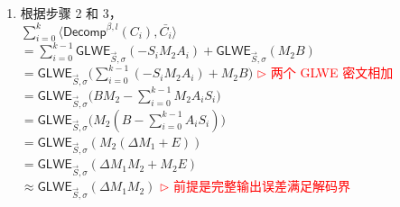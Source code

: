 \begin{myproof}
\begin{enumerate}
$ $
因此： \\
$\langle \textsf{Decomp}^{\beta, l}(A_0), \bar{C_0} \rangle + \langle \textsf{Decomp}^{\beta, l}(A_1), \bar{C_1} \rangle + \gap{$\cdots$} + \langle \textsf{Decomp}^{\beta, l}(A_{k-1}), \bar{C}_{k-1} \rangle$ \\
$= \sum\limits_{i=0}^{k-1}\langle \textsf{Decomp}^{\beta, l}(A_i), \bar{C_i} \rangle$ \\
$= \sum\limits_{i=0}^{k-1}\left(A_{\langle i, 1\rangle} \cdot \textsf{GLWE}_{\vec{S}, \sigma}\left(-S_iM_2\dfrac{q}{\beta^1}\right) + A_{\langle i, 2\rangle} \cdot \textsf{GLWE}_{\vec{S}, \sigma}\left(-S_iM_2\dfrac{q}{\beta^2}\right) + \gap{$\cdots$} + A_{\langle i, l\rangle} \cdot \textsf{GLWE}_{\vec{S}, \sigma}\left(-S_iM_2\dfrac{q}{\beta^l}\right)\right)$ \\
$= \sum\limits_{i=0}^{k-1}\left(\textsf{GLWE}_{\vec{S}, \sigma}\left(-A_{\langle i, 1\rangle}S_iM_2\dfrac{q}{\beta^1}\right) + \textsf{GLWE}_{\vec{S}, \sigma}\left(-A_{\langle i, 2\rangle}S_iM_2\dfrac{q}{\beta^2}\right) + \gap{$\cdots$} + \textsf{GLWE}_{\vec{S}, \sigma}\left(-A_{\langle i, l\rangle}S_iM_2\dfrac{q}{\beta^l}\right)\right)$ \\
$= \sum\limits_{i=0}^{k-1}\textsf{GLWE}_{\vec{S}, \sigma}\left(-A_{\langle i, 1\rangle}S_iM_2\dfrac{q}{\beta^1} + -A_{\langle i, 2\rangle}S_iM_2\dfrac{q}{\beta^2} + \gap{$\cdots$} + -A_{\langle i, l\rangle}S_iM_2\dfrac{q}{\beta^l}\right)$ \\
$= \sum\limits_{i=0}^{k-1}\textsf{GLWE}_{\vec{S}, \sigma}\left(-S_iM_2 \cdot \left(A_{\langle i, 1\rangle}\dfrac{q}{\beta^1} + A_{\langle i, 2\rangle}\dfrac{q}{\beta^2} + \gap{$\cdots$} + A_{\langle i, l\rangle}\dfrac{q}{\beta^l}\right)\right)$ \\
$= \sum\limits_{i=0}^{k-1}\textsf{GLWE}_{\vec{S}, \sigma}(-S_iM_2A_i)$
\item 根据步骤 2 和 3， \\
$\sum\limits_{i=0}^{k}\langle \textsf{Decomp}^{\beta, l}(C_i), \bar{C_i} \rangle$ \\
$= \sum\limits_{i=0}^{k-1}\textsf{GLWE}_{\vec{S}, \sigma}(-S_iM_2A_i) + \textsf{GLWE}_{\vec{S}, \sigma} (M_{2}B)$ \\ 
$= \textsf{GLWE}_{\vec{S}, \sigma}\Big(\sum\limits_{i=0}^{k-1}(-S_iM_2A_i) + M_{2}B\Big)$ \textcolor{red}{ $\rhd$ 两个 GLWE 密文相加} \\
$= \textsf{GLWE}_{\vec{S}, \sigma}\Big(BM_2 - \sum\limits_{i=0}^{k-1}M_2A_iS_i\Big)$  \\ 
$= \textsf{GLWE}_{\vec{S}, \sigma}\Big(M_2(B - \sum\limits_{i=0}^{k-1}A_iS_i)\Big)$\\
$= \textsf{GLWE}_{\vec{S}, \sigma}(M_2(\Delta M_1 + E))$ \\
$= \textsf{GLWE}_{\vec{S}, \sigma}(\Delta M_1M_2 + M_2E)$ \\
$\approx \textsf{GLWE}_{\vec{S}, \sigma}(\Delta M_1M_2)$ \textcolor{red}{ $\rhd$ 前提是完整输出误差满足解码界}
\end{enumerate}

\end{myproof}

